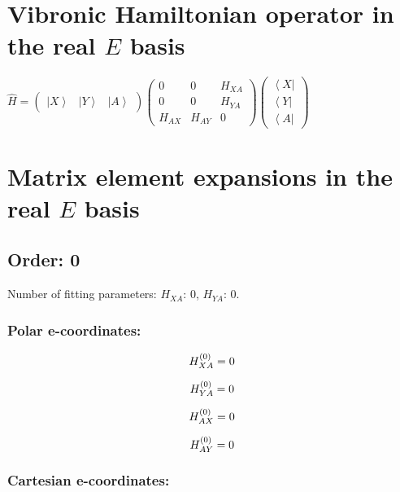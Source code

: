 \documentclass[fleqn]{article}
\begin{document}
\section{Vibronic Hamiltonian operator in the real $E$ basis}
$\hat{H}=\left(\begin{matrix}{\left|X\right\rangle } & {\left|Y\right\rangle } & {\left|A\right\rangle }\end{matrix}\right) \left(\begin{matrix}0 & 0 & H_{XA}\\0 & 0 & H_{YA}\\H_{AX} & H_{AY} & 0\end{matrix}\right) \left(\begin{matrix}{\left\langle X\right|}\\{\left\langle Y\right|}\\{\left\langle A\right|}\end{matrix}\right)$
\section{Matrix element expansions in the real $E$ basis}
\subsection{Order: 0}
Number of fitting parameters: $H_{XA}$: $0$, $H_{YA}$: $0$.
\subsubsection*{Polar e-coordinates:}

\begin{dmath*}
H_{XA}^{(0)}=0\\
\end{dmath*}

\begin{dmath*}
H_{YA}^{(0)}=0\\
\end{dmath*}

\begin{dmath*}
H_{AX}^{(0)}=0\\
\end{dmath*}

\begin{dmath*}
H_{AY}^{(0)}=0\\
\end{dmath*}
\subsubsection*{Cartesian e-coordinates:}
\end{document}
